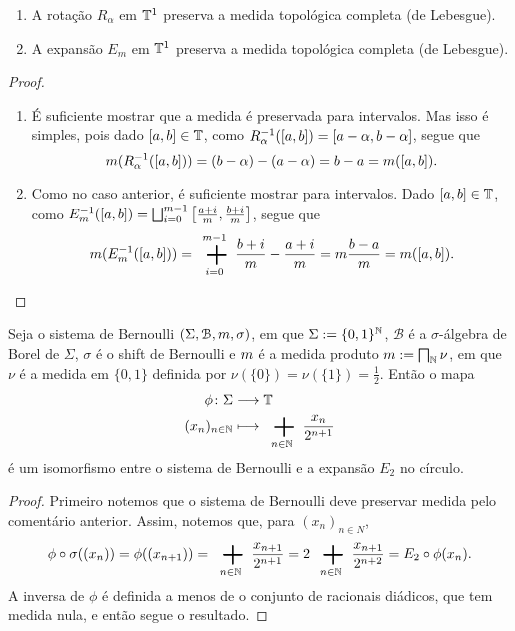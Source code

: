 \begin{proposition}
	\begin{enumerate}
	\item A rotação $R_\alpha$ em $\mathbb{T}^1$ preserva a medida topológica completa (de Lebesgue).
	\item A expansão $E_m$ em $\mathbb{T}^1$ preserva a medida topológica completa (de Lebesgue).
	\end{enumerate}
\end{proposition}
\begin{proof}
	\begin{enumerate}
	\item É suficiente mostrar que a medida é preservada para intervalos. Mas isso é simples, pois dado $\left[a,\allowbreak b\right] \in \mathbb{T}$, como $R_{\alpha}^{-1}(\left[a,\allowbreak b\right])=\left[a-\alpha,\allowbreak b-\alpha\right]$, segue que
	\begin{equation*}
	m(R_{\alpha}^{-1}(\left[a,\allowbreak b\right]))=(b-\alpha)-(a-\alpha)=b-a=m(\left[a,\allowbreak b\right]).
	 \end{equation*}

	 \item Como no caso anterior, é suficiente mostrar para intervalos. Dado $\left[a,\allowbreak b\right] \in \mathbb{T}$, como $E_m^{-1}(\left[a,\allowbreak b\right])=\bigsqcup_{i=0}^{m-1} \left[\frac{a+i}{m},\allowbreak \frac{b+i}{m}\right]$, segue que
	\begin{equation*}
	\med(E_m\inv(\intff{a}{b}))=\sum_{i=0}^{m-1}\frac{b+i}{m}-\frac{a+i}{m}=m\frac{b-a}{m}=\med(\intff{a}{b}).
	 \end{equation*}
	\end{enumerate}
\end{proof}

\begin{proposition}
	Seja o sistema de Bernoulli $(\Sigma,\mathcal{B},m,\sigma)$, em que $\Sigma := \{0,1\}^{\mathbb{N}}$, $\mathcal{B}$ é a $\sigma$-álgebra de Borel de $\Sigma$, $\sigma$ é o shift de Bernoulli e $m$ é a medida produto $\med := \prod_{\N} \nu$, em que $\nu$ é a medida em $\{0,1\}$ definida por $\nu(\{0\})=\nu(\{1\})=\frac{1}{2}$. Então o mapa
	\begin{align*}
	\func{\phi}{\Sigma}{\T}{(x_n)_{n \in \N}}{\sum_{n \in \N} \frac{x_n}{2^{n+1}}}
	\end{align*}
é um isomorfismo entre o sistema de Bernoulli e a expansão $E_2$ no círculo.
\end{proposition}
\begin{proof}
	Primeiro notemos que o sistema de Bernoulli deve preservar medida pelo comentário anterior. Assim, notemos que, para $(x_n)_{n \in N}$,
	\begin{equation*}
	\phi \circ \sigma((x_n))=\phi((x_{n+1}))=\sum_{n \in \N} \frac{x_{n+1}}{2^{n+1}}=2\sum_{n \in \N} \frac{x_{n+1}}{2^{n+2}}= E_2\circ \phi(x_n).
	\end{equation*}
A inversa de $\phi$ é definida a menos de o conjunto de racionais diádicos, que tem medida nula, e então segue o resultado.
\end{proof}


